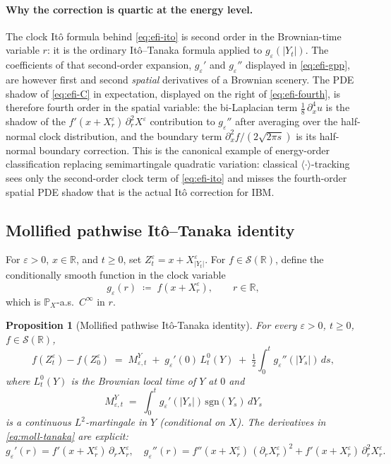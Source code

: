 \documentclass[11pt,reqno]{amsart}
\theoremstyle{plain}
\newtheorem{proposition}[theorem]{Proposition}
\theoremstyle{definition}
\theoremstyle{remark}
\newcommand{\R}{\mathbb{R}}
\newcommand{\Prob}{\mathbb{P}}
\begin{document}
\paragraph{Why the correction is quartic at the energy level.}
The clock It\^o formula behind \eqref{eq:efi-ito} is second order in
the Brownian-time variable $r$: it is the ordinary It\^o--Tanaka
formula applied to $g_\varepsilon(|Y_t|)$. The coefficients of that
second-order expansion, $g_\varepsilon'$ and $g_\varepsilon''$
displayed in \eqref{eq:efi-gpp}, are however first and second
\emph{spatial} derivatives of a Brownian scenery. The PDE shadow of
\eqref{eq:efi-C} in expectation, displayed on the right of
\eqref{eq:efi-fourth}, is therefore fourth order in the spatial
variable: the bi-Laplacian term $\tfrac18\,\partial_x^{4}u$ is the
shadow of the $f'(x+X^\varepsilon_r)\,\partial_r^{2}X^\varepsilon$
contribution to $g_\varepsilon''$ after averaging over the
half-normal clock distribution, and the boundary term
$\partial_x^{2}f/(2\sqrt{2\pi s})$ is its half-normal boundary
correction. This is the canonical example of energy-order
classification replacing semimartingale quadratic variation:
classical $\langle\cdot\rangle$-tracking sees only the second-order
clock term of \eqref{eq:efi-ito} and misses the fourth-order spatial
PDE shadow that is the actual It\^o correction for IBM.

\subsection*{Mollified pathwise It\^o--Tanaka identity}

For $\varepsilon>0$, $x\in\R$, and $t\ge 0$, set
$Z_t^\varepsilon=x+X^\varepsilon_{|Y_t|}$. For $f\in\mathscr S(\R)$,
define the conditionally smooth function in the clock variable
\[
  g_\varepsilon(r)\;\coloneqq\;f(x+X^\varepsilon_r),
  \qquad r\in\R,
\]
which is $\Prob_X$-a.s.\ $C^\infty$ in $r$.

\begin{proposition}[Mollified pathwise It\^o-Tanaka identity]
\label{prop:moll-tanaka}
For every $\varepsilon>0$, $t\ge 0$, $f\in\mathscr S(\R)$,
\begin{equation}\label{eq:moll-tanaka}
  f(Z_t^\varepsilon)-f(Z_0^\varepsilon)
  \;=\;M_{\varepsilon,t}^{Y}\;+\;g_\varepsilon'(0)\,L_t^{0}(Y)
       \;+\;\tfrac12\!\int_0^t g_\varepsilon''(|Y_s|)\,ds,
\end{equation}
where $L_t^{0}(Y)$ is the Brownian local time of $Y$ at $0$ and
\begin{equation}\label{eq:moll-mart}
  M_{\varepsilon,t}^{Y}\;=\;\int_0^t g_\varepsilon'(|Y_s|)\,
   \mathrm{sgn}(Y_s)\,dY_s
\end{equation}
is a continuous $L^{2}$-martingale in $Y$ (conditional on $X$). The
derivatives in \eqref{eq:moll-tanaka} are explicit:
\[
  g_\varepsilon'(r)=f'(x+X^\varepsilon_r)\,\partial_rX^\varepsilon_r,
  \quad
  g_\varepsilon''(r)=f''(x+X^\varepsilon_r)\,(\partial_rX^\varepsilon_r)^{2}
   +f'(x+X^\varepsilon_r)\,\partial_r^{2}X^\varepsilon_r.
\]
\end{proposition}
\end{document}
